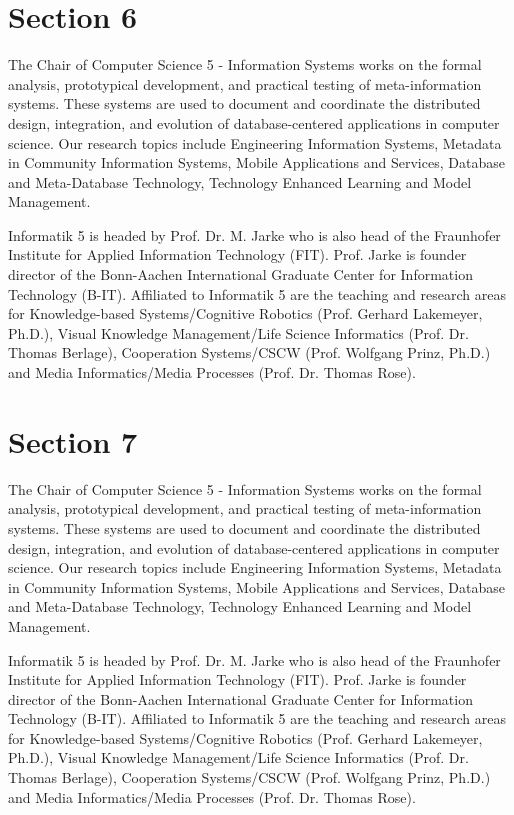 \section{Section 6}


The Chair of Computer Science 5 - Information Systems works on the formal
analysis, prototypical development, and practical testing of meta-information
systems. These systems are used to document and coordinate the distributed
design, integration, and evolution of database-centered applications in computer
science. Our research topics include Engineering Information Systems, Metadata
in Community Information Systems, Mobile Applications and Services, Database and
Meta-Database Technology, Technology Enhanced Learning and Model Management.

Informatik 5 is headed by Prof. Dr. M. Jarke who is also head of the Fraunhofer
Institute for Applied Information Technology (FIT). Prof. Jarke is founder
director of the Bonn-Aachen International Graduate Center for Information
Technology (B-IT). Affiliated to Informatik 5 are the teaching and research
areas for Knowledge-based Systems/Cognitive Robotics (Prof. Gerhard Lakemeyer,
Ph.D.), Visual Knowledge Management/Life Science Informatics (Prof. Dr. Thomas
Berlage), Cooperation Systems/CSCW (Prof. Wolfgang Prinz, Ph.D.) and Media
Informatics/Media Processes (Prof. Dr. Thomas Rose).


\section{Section 7}


The Chair of Computer Science 5 - Information Systems works on the formal
analysis, prototypical development, and practical testing of meta-information
systems. These systems are used to document and coordinate the distributed
design, integration, and evolution of database-centered applications in computer
science. Our research topics include Engineering Information Systems, Metadata
in Community Information Systems, Mobile Applications and Services, Database and
Meta-Database Technology, Technology Enhanced Learning and Model Management.

Informatik 5 is headed by Prof. Dr. M. Jarke who is also head of the Fraunhofer
Institute for Applied Information Technology (FIT). Prof. Jarke is founder
director of the Bonn-Aachen International Graduate Center for Information
Technology (B-IT). Affiliated to Informatik 5 are the teaching and research
areas for Knowledge-based Systems/Cognitive Robotics (Prof. Gerhard Lakemeyer,
Ph.D.), Visual Knowledge Management/Life Science Informatics (Prof. Dr. Thomas
Berlage), Cooperation Systems/CSCW (Prof. Wolfgang Prinz, Ph.D.) and Media
Informatics/Media Processes (Prof. Dr. Thomas Rose).


